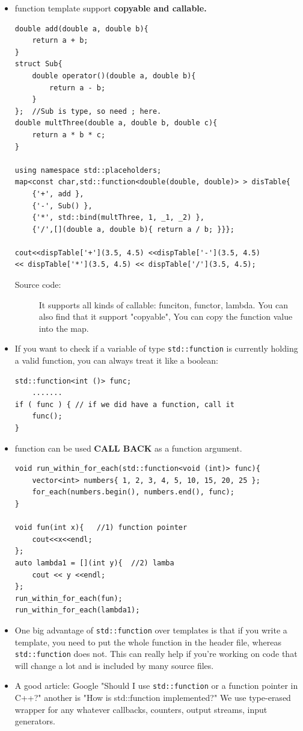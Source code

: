 \documentclass[a4paper,11pt,twoside]{book}
\begin{document}
\begin{itemize}
	\item function template support \textbf{copyable and callable.}
\begin{lstlisting}[numbers=none]
double add(double a, double b){
	return a + b;
}	
struct Sub{
	double operator()(double a, double b){
		return a - b;
	}
};	//Sub is type, so need ; here.
double multThree(double a, double b, double c){
	return a * b * c;
}
	
using namespace std::placeholders;
map<const char,std::function<double(double, double)> > disTable{
	{'+', add },                                         
	{'-', Sub() },                                      
	{'*', std::bind(multThree, 1, _1, _2) },             
	{'/',[](double a, double b){ return a / b; }}};      
	
cout<<dispTable['+'](3.5, 4.5) <<dispTable['-'](3.5, 4.5) 
<< dispTable['*'](3.5, 4.5) << dispTable['/'](3.5, 4.5);
\end{lstlisting}
	\begin{description}
		\item[Source code:] It supports all kinds of callable: funciton, functor, lambda. You can also find that it support "copyable", You can copy the function value into the map. 
	\end{description}
	
	\item If you want to check if a variable of type \texttt{std::function} is currently holding a valid function, you can always treat it like a boolean:
\begin{lstlisting}[numbers=none]
std::function<int ()> func;
	.......
if ( func ) { // if we did have a function, call it
	func();
}
\end{lstlisting}
	
	\item function can be used \textbf{CALL BACK} as a function argument. 
	
\begin{lstlisting}[numbers=none]
void run_within_for_each(std::function<void (int)> func){
	vector<int> numbers{ 1, 2, 3, 4, 5, 10, 15, 20, 25 };
	for_each(numbers.begin(), numbers.end(), func);
}
	
void fun(int x){   //1) function pointer
	cout<<x<<endl;
};	
auto lambda1 = [](int y){  //2) lamba
	cout << y <<endl;
};	
run_within_for_each(fun);
run_within_for_each(lambda1);
\end{lstlisting}
	
	\item One big advantage of \texttt{std::function} over templates is that if you write a template, you need to put the whole function in the header file, whereas \texttt{std::function} does not. This can really help if you're working on code that will change a lot and is included by many source files.
	
	\item A good article: Google "Should I use \texttt{std::function} or a function pointer in C++?" another is "How is std::function implemented?" We use type-erased wrapper for any whatever callbacks, counters, output streams, input generators.
	
\end{itemize}
\end{document}
